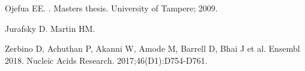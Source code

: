 \documentclass[10pt,letterpaper]{article}
\begin{document}
	

	\nolinenumbers
	
	\begin{thebibliography}{10}
		
		Ojefua EE.
		.
		\newblock Masters thesis. University of Tampere; 2009.
		
		Jurafsky D. Martin HM.
		
		Zerbino D, Achuthan P, Akanni W, Amode M, Barrell D, Bhai J et al. 
		\newblock Ensembl 2018. 
		\newblock Nucleic Acids Research. 2017;46(D1):D754-D761. 
		
	\end{thebibliography}
	
	
	
\end{document}
